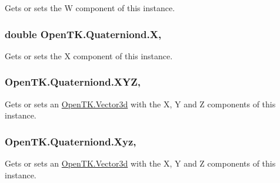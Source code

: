 Gets or sets the W component of this instance. 

\hypertarget{struct_open_t_k_1_1_quaterniond_ad327401a2d49e95a009185f844238046}{
\subsubsection[{X}]{\setlength{\rightskip}{0pt plus 5cm}double Open\-T\-K.\-Quaterniond.\-X\hspace{0.3cm}{\ttfamily [get]}, {\ttfamily [set]}}}\label{struct_open_t_k_1_1_quaterniond_ad327401a2d49e95a009185f844238046}


Gets or sets the X component of this instance. 

\hypertarget{struct_open_t_k_1_1_quaterniond_aaa7eee901e44e92bdeeaa260f100f3ea}{
\subsubsection[{X\-Y\-Z}]{ Open\-T\-K.\-Quaterniond.\-X\-Y\-Z\hspace{0.3cm}{\ttfamily [get]}, {\ttfamily [set]}}}\label{struct_open_t_k_1_1_quaterniond_aaa7eee901e44e92bdeeaa260f100f3ea}


Gets or sets an \hyperlink{struct_open_t_k_1_1_vector3d}{Open\-T\-K.\-Vector3d} with the X, Y and Z components of this instance. 

\hypertarget{struct_open_t_k_1_1_quaterniond_a4be7aa1af1afd9ab2f1cba872a191f70}{
\subsubsection[{Xyz}]{ Open\-T\-K.\-Quaterniond.\-Xyz\hspace{0.3cm}{\ttfamily [get]}, {\ttfamily [set]}}}\label{struct_open_t_k_1_1_quaterniond_a4be7aa1af1afd9ab2f1cba872a191f70}


Gets or sets an \hyperlink{struct_open_t_k_1_1_vector3d}{Open\-T\-K.\-Vector3d} with the X, Y and Z components of this instance. 

